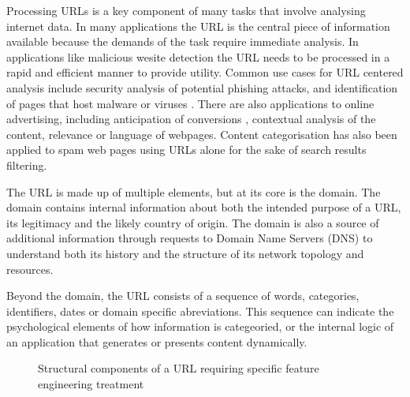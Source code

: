 \documentclass{aircc}
\begin{document}
Processing URLs is a key component of many tasks that involve
analysing internet data. In many applications the URL is the central piece of 
information available because the demands of the task require immediate analysis.
In applications like malicious wesite detection the URL needs to be processed
in a rapid and efficient manner to provide utility\cite{Ma2009b}.
Common use cases for URL centered analysis include security analysis of potential 
phishing attacks\cite{Garera2007,Basnet2012,Basnet2014,Mamun2016,Verma2017,Vazhayil2018,Tupsamudre2019,Sirigineedi2020,Li2020}, 
and identification of pages that host malware or viruses \cite{Canali2011,Mamun2016}.
There are also applications to online advertising,
including anticipation of conversions \cite{Qiu2020}, contextual analysis of
the content\cite{Kan2004,Shih2004,Baykan2009,Meshkizadeh2010,Hernandez2012,Arya2016}, relevance \cite{Kan2005} 
or language\cite{Baykan2013} of webpages. 
Content categorisation has also been applied to spam web pages using URLs alone for the sake
of search results filtering\cite{Chung2010,Hassan2008}.

The URL is made up of multiple elements, but at its core is the domain. The domain
contains internal information about both the intended purpose of a URL, its legitimacy 
and the likely country of origin. The domain is also a source of additional information 
through requests to Domain Name Servers (DNS) to understand both its history and the
structure of its network topology and resources.

Beyond the domain, the URL consists of a sequence of words, categories, identifiers, dates
or domain specific abreviations. This sequence can indicate the psychological elements of how
information is categeoried, or the internal logic of an application that generates or presents
content dynamically. 

\begin{figure}
\centering
{}
\caption{Structural components of a URL requiring specific feature engineering treatment}
\label{fig:url_structure}
\end{figure}
\end{document}
